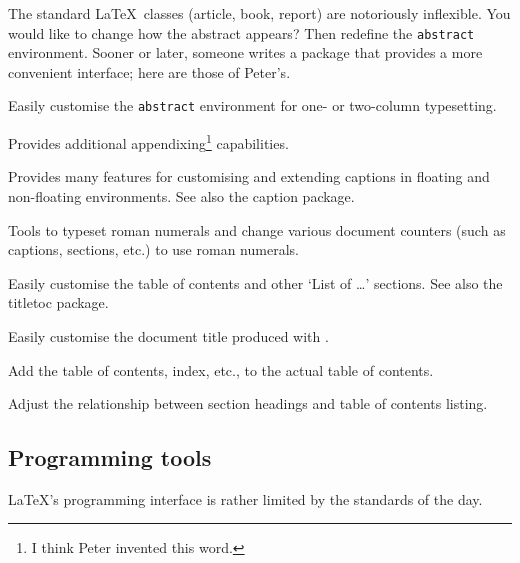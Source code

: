 \documentclass{ltugboat}
\begin{document}
The standard \LaTeX\ classes (\textsf{article}, \textsf{book}, \textsf{report}) are notoriously inflexible. You would like to change how the abstract appears? Then redefine the \texttt{abstract} environment. Sooner or later, someone writes a package that provides a more convenient interface; here are those of Peter's.

\begin{description}[font=\normalfont\sffamily]
\item [abstract] Easily customise the \texttt{abstract} environment for one- or two-column typesetting.
\item [appendix] Provides additional appendixing\footnote{I think Peter invented this word.} capabilities.
\item [ccaption] Provides many features for customising and extending captions in floating and non-floating environments. See also the \textsf{caption} package.
\item [romannum] Tools to typeset roman numerals and change various document counters (such as captions, sections, etc.) to use roman numerals.
\item [tocloft] Easily customise the table of contents and other `List of \dots' sections. See also the \textsf{titletoc} package.
\item [titling] Easily customise the document title produced with .
\item [tocbibind] Add the table of contents, index, etc., to the actual table of contents.
\item [tocvsec2] Adjust the relationship between section headings and table of contents listing.
\end{description}

\subsection{Programming tools}

\LaTeX's programming interface is rather limited by the standards of the day.
\end{document}
